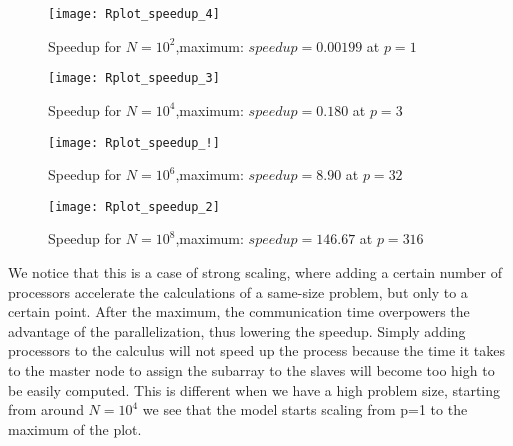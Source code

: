 \documentclass[11pt]{scrartcl} %
\begin{document}
\begin{figure}[H] %
	\centering
	\texttt{[image: Rplot\_speedup\_4]} %
	\caption{Speedup for $N=10^2$,maximum: $speedup = 0.00199$ at $p = 1$}
\end{figure}


\begin{figure}[H] %
	\centering
	\texttt{[image: Rplot\_speedup\_3]} %
	\caption{Speedup for $N=10^4$,maximum: $speedup = 0.180$ at $p = 3$}
\end{figure}

\begin{figure}[H] %
	\centering
	\texttt{[image: Rplot\_speedup\_!]} %
	\caption{Speedup for $N=10^6$,maximum: $speedup = 8.90$ at $p = 32$}
\end{figure}
\begin{figure}[H] %
	\centering
	\texttt{[image: Rplot\_speedup\_2]} %
	\caption{Speedup for $N=10^8$,maximum: $speedup = 146.67$ at $p = 316$}
\end{figure}

We notice that this is a case of strong scaling, where adding a certain number of processors accelerate the calculations of a same-size problem, but only to a certain point. After the maximum, the communication time overpowers the advantage of the parallelization, thus lowering the speedup. Simply adding processors to the calculus will not speed up the process because the time it takes to the master node to assign the subarray to the slaves will become too high to be easily computed.
This is different when we have a high problem size, starting from around $N=10^4$
we see that the model starts scaling from p=1 to the maximum of the plot.
\end{document}
